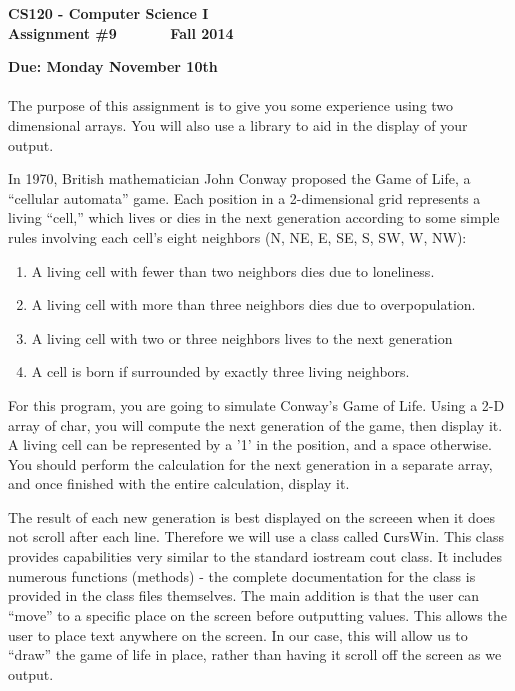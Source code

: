 \documentclass[11pt]{article}
\begin{document}
\begin{center}
\huge
\bf
{\sffamily CS120 - Computer Science I               \\
Assignment \#9~~~~~~ Fall   2014} 

\end{center}
\normalsize
\textbf{Due: Monday November 10th}
\\
\\
The purpose of this assignment is to give you some experience using two
dimensional arrays. You will also use a library to aid in  the display of
your output.

In 1970, British mathematician John Conway proposed the Game of Life,
a ``cellular automata'' game.
Each position in a 2-dimensional grid represents a living ``cell,'' which 
lives or dies in the next generation according to some simple rules involving
each cell's eight neighbors (N, NE, E, SE, S, SW, W, NW):

\small
\begin{enumerate}
 \item A living cell with fewer than two neighbors dies due to loneliness.
 \item A living cell with more than three neighbors dies due to overpopulation.
 \item A living cell with two or three neighbors lives to the next generation
 \item A cell is born if surrounded by exactly three living neighbors.
\end{enumerate}
\normalsize 

For this program, you are going to simulate Conway's Game of Life. Using a
2-D array of char, you will compute the next generation of the game, then 
display it. A living cell can be represented by a '1' in the position, and
a space otherwise. You should perform the calculation for the next generation
in a separate array, and once finished with the entire calculation, display
it.

The result of each new generation is best displayed on the screeen when it
does not scroll after each line. Therefore we will use a class called 
{\texttt CursWin}. This class provides capabilities very similar to the
standard iostream cout class. It includes numerous functions (methods) - the
complete documentation for the class is provided in the class files 
themselves. The main addition is that the user can ``move'' to a specific
place on the screen before outputting values. This allows the user to place
text anywhere on the screen. In our case, this will allow us to ``draw''
the game of life in place, rather than having it scroll off the screen as
we output.
\end{document}

